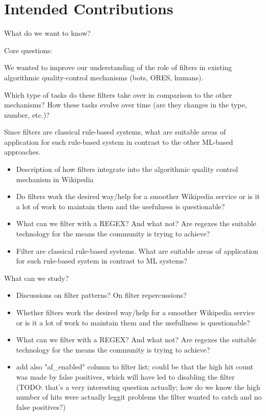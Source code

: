 \documentclass{sigchi}
\begin{document}


\section{Intended Contributions}

What do we want to know?

Core questions:

We wanted to improve our understanding of the role of filters in existing algorithmic quality-control mechanisms (bots, ORES, humans).

Which type of tasks do these filters take over in comparison to the other mechanisms? How these tasks evolve over time (are they changes in the type, number, etc.)?

Since filters are classical rule-based systems, what are suitable areas of application for such rule-based system in contrast to the other ML-based approaches.


\begin{itemize}
    \item Description of how filters integrate into the algorithmic quality control mechanism in Wikipedia
    \item Do filters work the desired way/help for a smoother Wikipedia service or is it a lot of work to maintain them and the usefulness is questionable?
    \item What can we filter with a REGEX? And what not? Are regexes the suitable technology for the means the community is trying to achieve?
    \item Filter are classical rule-based systems. What are suitable areas of application for such rule-based system in contrast to ML systems?
\end{itemize}


What can we study?

\begin{itemize}
    \item Discussions on filter patterns? On filter repercussions?
    \item Whether filters work the desired way/help for a smoother Wikipedia service or is it a lot of work to maintain them and the usefullness is questionable?
    \item What can we filter with a REGEX? And what not? Are regexes the suitable technology for the means the community is trying to achieve?
    \item add also "af\_enabled" column to filter list; could be that the high hit count was made by false positives, which will have led to disabling the filter (TODO: that's a very interesting question actually; how do we know the high number of hits were actually leggit problems the filter wanted to catch and no false positives?)
\end{itemize}
\end{document}
